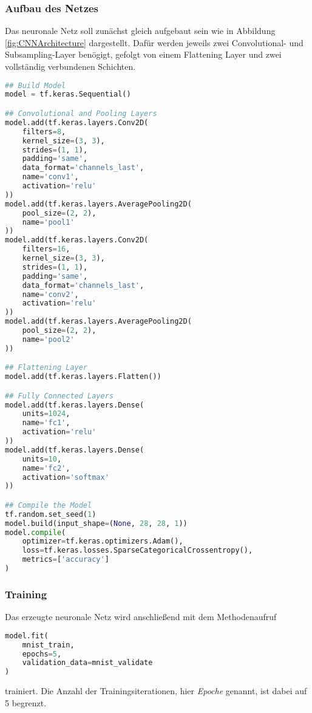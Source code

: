 \documentclass[12pt,a4]{article}
\begin{document}
\subsubsection*{Aufbau des Netzes}
Das neuronale Netz soll zunächst gleich aufgebaut sein wie in Abbildung \ref{fig:CNNArchitecture} dargestellt. Dafür werden jeweils zwei Convolutional- und Subsampling-Layer benögigt, gefolgt von einem Flattening Layer und zwei vollständig verbundenen Schichten.
\begin{lstlisting}[language=Python]
## Build Model
model = tf.keras.Sequential()

## Convolutional and Pooling Layers
model.add(tf.keras.layers.Conv2D(
    filters=8, 
    kernel_size=(3, 3), 
    strides=(1, 1), 
    padding='same', 
    data_format='channels_last', 
    name='conv1', 
    activation='relu'
))
model.add(tf.keras.layers.AveragePooling2D(
    pool_size=(2, 2), 
    name='pool1'
))
model.add(tf.keras.layers.Conv2D(
    filters=16, 
    kernel_size=(3, 3), 
    strides=(1, 1), 
    padding='same', 
    data_format='channels_last', 
    name='conv2', 
    activation='relu'
))
model.add(tf.keras.layers.AveragePooling2D(
    pool_size=(2, 2), 
    name='pool2'
))

## Flattening Layer
model.add(tf.keras.layers.Flatten())

## Fully Connected Layers
model.add(tf.keras.layers.Dense(
    units=1024, 
    name='fc1', 
    activation='relu'
))
model.add(tf.keras.layers.Dense(
    units=10, 
    name='fc2', 
    activation='softmax'
))

## Compile the Model
tf.random.set_seed(1)
model.build(input_shape=(None, 28, 28, 1))
model.compile(
    optimizer=tf.keras.optimizers.Adam(), 
    loss=tf.keras.losses.SparseCategoricalCrossentropy(), 
    metrics=['accuracy']
)
\end{lstlisting}

\subsubsection*{Training}
Das erzeugte neuronale Netz wird anschließend mit dem Methodenaufruf
\begin{lstlisting}[language=Python]
model.fit(
    mnist_train, 
    epochs=5, 
    validation_data=mnist_validate
)
\end{lstlisting}
trainiert. Die Anzahl der Trainingsiterationen, hier \textit{Epoche} genannt, ist dabei auf 5 begrenzt. 
\end{document}
